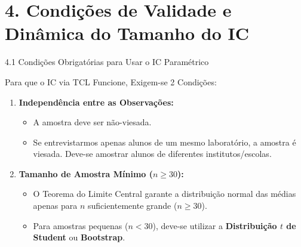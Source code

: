 \documentclass[10pt, aspectratio=169]{beamer}
\begin{document}
\section{4. Condições de Validade e Dinâmica do Tamanho do IC}

\begin{frame}{4.1 Condições Obrigatórias para Usar o IC Paramétrico}
    \begin{block}{Para que o IC via TCL Funcione, Exigem-se 2 Condições:}
        \begin{enumerate}
            \item \textbf{Independência entre as Observações:}
                  \begin{itemize}
                      \item A amostra deve ser não-viesada.
                      \item Se entrevistarmos apenas alunos de um mesmo laboratório, a amostra é viesada. Deve-se amostrar alunos de diferentes institutos/escolas.
                  \end{itemize}
            \item \textbf{Tamanho de Amostra Mínimo ($n \ge 30$):}
                  \begin{itemize}
                      \item O Teorema do Limite Central garante a distribuição normal das médias apenas para $n$ suficientemente grande ($n \ge 30$).
                      \item Para amostras pequenas ($n < 30$), deve-se utilizar a \textbf{Distribuição $t$ de Student} ou \textbf{Bootstrap}.
                  \end{itemize}
        \end{enumerate}
    \end{block}
\end{frame}
\end{document}

